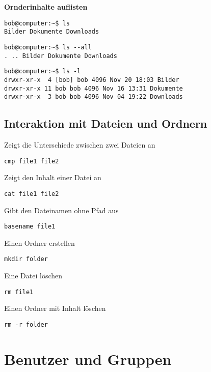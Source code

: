 \documentclass[11pt]{article}
\begin{document}
\textbf{Ornderinhalte auflisten}

\begin{lstlisting}[style=terminal]
bob@computer:~$ ls
Bilder Dokumente Downloads
\end{lstlisting}

\begin{lstlisting}[style=terminal]
bob@computer:~$ ls --all
. .. Bilder Dokumente Downloads
\end{lstlisting}

\begin{lstlisting}[style=terminal]
bob@computer:~$ ls -l
drwxr-xr-x  4 [bob] bob 4096 Nov 20 18:03 Bilder
drwxr-xr-x 11 bob bob 4096 Nov 16 13:31 Dokumente
drwxr-xr-x  3 bob bob 4096 Nov 04 19:22 Downloads
\end{lstlisting}

\subsection {Interaktion mit Dateien und Ordnern}

\begin{multicols}{2}
Zeigt die Unterschiede zwischen zwei Dateien an
\begin{lstlisting}
cmp file1 file2
\end{lstlisting}
\columnbreak
Zeigt den Inhalt einer Datei an
\begin{lstlisting}
cat file1 file2
\end{lstlisting}
\end{multicols}

\begin{multicols}{2}
Gibt den Dateinamen ohne Pfad aus
\begin{lstlisting}
basename file1
\end{lstlisting}
\columnbreak
Einen Ordner erstellen
\begin{lstlisting}
mkdir folder
\end{lstlisting}
\end{multicols}

\begin{multicols}{2}
Eine Datei löschen
\begin{lstlisting}
rm file1
\end{lstlisting}
\columnbreak
Einen Ordner mit Inhalt löschen
\begin{lstlisting}
rm -r folder
\end{lstlisting}
\end{multicols}

\section {Benutzer und Gruppen}
\end{document}

